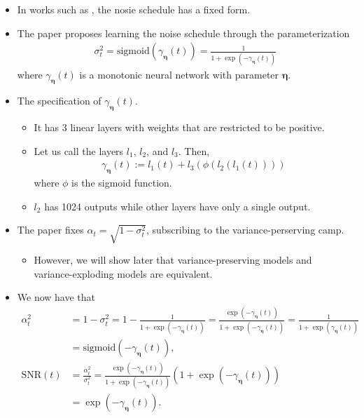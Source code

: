 \documentclass[10pt]{article}
\newcommand{\ves}[1]{\boldsymbol{#1}}
\newcommand{\mrm}[1]{\mathrm{#1}}
\newcommand{\SNR}{\mathrm{SNR}}
\begin{document}
\begin{itemize}
  \item In works such as \cite{Ho:2020}, the nosie schedule has a fixed form.
  
  \item The paper proposes learning the noise schedule through the parameterization
  \begin{align*}
    \sigma_t^2 = \mrm{sigmoid}(\gamma_{\ves{\eta}}(t)) = \frac{1}{1 + \exp(-\gamma_{\ves{\eta}}(t))}
  \end{align*}
  where $\gamma_{\ves{\eta}}(t)$ is a monotonic neural network with parameter $\ves{\eta}$.
  
  \item The specification of $\gamma_{\ves{\eta}}(t)$.
  \begin{itemize}
    \item It has 3 linear layers with weights that are restricted to be positive.
    
    \item Let us call the layers $l_1$, $l_2$, and $l_3$. Then,
    \begin{align*}
      \gamma_{\ves{\eta}}(t) := l_1(t) + l_3(\phi(l_2(l_1(t))))
    \end{align*}
    where $\phi$ is the sigmoid function.

    \item $l_2$ has 1024 outputs while other layers have only a single output.
  \end{itemize}

  \item The paper fixes $\alpha_t = \sqrt{1 - \sigma_t^2}$, subscribing to the variance-perserving camp.
  \begin{itemize}
    \item However, we will show later that variance-preserving models and variance-exploding models are equivalent.    
  \end{itemize}

  \item We now have that
  \begin{align*}
    \alpha_t^2 
    &= 1 - \sigma_t^2 
    = 1 - \frac{1}{1 + \exp(-\gamma_{\ves{\eta}}(t))}
    = \frac{\exp(-\gamma_{\ves{\eta}}(t))}{1 + \exp(-\gamma_{\ves{\eta}}(t))}
    = \frac{1}{1 + \exp(\gamma_{\ves{\eta}}(t))} \\
    &= \mrm{sigmoid}(-\gamma_{\ves{\eta}}(t)), \\
    \SNR(t)
    &= \frac{\alpha^2_t}{\sigma^2_t}
    = \frac{\exp(-\gamma_{\ves{\eta}}(t))}{1 + \exp(-\gamma_{\ves{\eta}}(t))} (1 + \exp(-\gamma_{\ves{\eta}}(t))) \\
    &= \exp(-\gamma_{\ves{\eta}}(t)).
  \end{align*}
\end{itemize}
\end{document}
